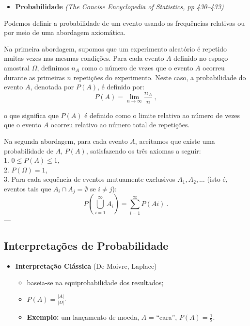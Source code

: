\documentclass[
]{book}
\providecommand{\tightlist}{%
  \setlength{\itemsep}{0pt}\setlength{\parskip}{0pt}}
\begin{document}
\begin{itemize}
\tightlist
\item
  \textbf{Probabilidade} \emph{(The Concise Encyclopedia of Statistics, pp 430--433)}
\end{itemize}

Podemos definir a probabilidade de um evento usando as frequências relativas ou por meio de uma abordagem axiomática.

Na primeira abordagem, supomos que um experimento aleatório é repetido muitas vezes nas mesmas condições. Para cada evento \(A\) definido no espaço amostral \(\Omega\), definimos \(n_A\) como o número de vezes que o evento \(A\) ocorreu durante as primeiras \(n\) repetições do experimento. Neste caso, a probabilidade do evento \(A\), denotada por \(P(A)\), é definido por:
\[P(A) = \lim_{n\rightarrow\infty} \frac{n_A}{n}~,\]

o que significa que \(P(A)\) é definido como o limite relativo ao número de vezes que o evento \(A\) ocorreu relativo ao número total de repetições.

Na segunda abordagem, para cada evento \(A\), aceitamos que existe uma probabilidade de \(A\), \(P(A)\), satisfazendo os três axiomas a seguir:\\
1. \(0\leq P(A)\leq 1\),\\
2. \(P(\Omega)=1\),\\
3. Para cada sequência de eventos mutuamente exclusivos \(A_1,A_2,\ldots\) (isto é, eventos tais que \(A_i \cap A_j = \emptyset\) se \(i \neq j\)):
\[ P\left(\bigcup_{i=1}^{\infty} A_i\right) = \sum_{i=1}^{\infty} P(Ai)~.\]
---

\subsection{Interpretações de Probabilidade}\label{interpretauxe7uxf5es-de-probabilidade}

\begin{itemize}
\tightlist
\item
  \textbf{Interpretação Clássica} (De Moivre, Laplace)

  \begin{itemize}
  \tightlist
  \item
    baseia-se na equiprobabilidade dos resultados;
  \item
    \(P(A) = \frac{|A|}{|\Omega|}\).
  \item
    \textbf{Exemplo:} um lançamento de moeda, \(A\) = ``cara'', \(P(A) = \frac{1}{2}\).
  \end{itemize}
\end{itemize}
\end{document}
